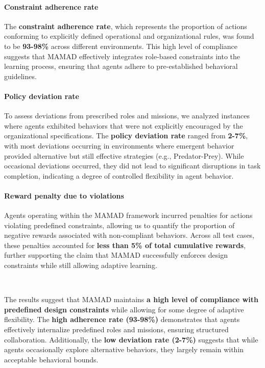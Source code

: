 \documentclass[journal]{IEEEtai}
\begin{document}
\paragraph{Constraint adherence rate}
The \textbf{constraint adherence rate}, which represents the proportion of actions conforming to explicitly defined operational and organizational rules, was found to be \textbf{93-98\%} across different environments. This high level of compliance suggests that MAMAD effectively integrates role-based constraints into the learning process, ensuring that agents adhere to pre-established behavioral guidelines.

\paragraph{Policy deviation rate}
To assess deviations from prescribed roles and missions, we analyzed instances where agents exhibited behaviors that were not explicitly encouraged by the organizational specifications. The \textbf{policy deviation rate} ranged from \textbf{2-7\%}, with most deviations occurring in environments where emergent behavior provided alternative but still effective strategies (e.g., Predator-Prey). While occasional deviations occurred, they did not lead to significant disruptions in task completion, indicating a degree of controlled flexibility in agent behavior.

\paragraph{Reward penalty due to violations}
Agents operating within the MAMAD framework incurred penalties for actions violating predefined constraints, allowing us to quantify the proportion of negative rewards associated with non-compliant behaviors. Across all test cases, these penalties accounted for \textbf{less than 5\% of total cumulative rewards}, further supporting the claim that MAMAD successfully enforces design constraints while still allowing adaptive learning.

\

The results suggest that MAMAD maintains \textbf{a high level of compliance with predefined design constraints} while allowing for some degree of adaptive flexibility. The \textbf{high adherence rate (93-98\%)} demonstrates that agents effectively internalize predefined roles and missions, ensuring structured collaboration. Additionally, the \textbf{low deviation rate (2-7\%)} suggests that while agents occasionally explore alternative behaviors, they largely remain within acceptable behavioral bounds.
\end{document}
